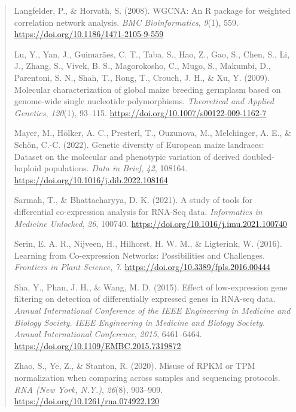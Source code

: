 \documentclass[
]{article}
\begin{document}
\begin{quote}
Langfelder, P., \& Horvath, S. (2008). WGCNA: An R package for weighted
correlation network analysis. \emph{BMC Bioinformatics}, \emph{9}(1),
559.
\href{https://doi.org/10.1186/1471-2105-9-559}{{https://doi.org/10.1186/1471-2105-9-559}}

Lu, Y., Yan, J., Guimarães, C. T., Taba, S., Hao, Z., Gao, S., Chen, S.,
Li, J., Zhang, S., Vivek, B. S., Magorokosho, C., Mugo, S., Makumbi, D.,
Parentoni, S. N., Shah, T., Rong, T., Crouch, J. H., \& Xu, Y. (2009).
Molecular characterization of global maize breeding germplasm based on
genome-wide single nucleotide polymorphisms. \emph{Theoretical and
Applied Genetics}, \emph{120}(1), 93--115.
\href{https://doi.org/10.1007/s00122-009-1162-7}{{https://doi.org/10.1007/s00122-009-1162-7}}

Mayer, M., Hölker, A. C., Presterl, T., Ouzunova, M., Melchinger, A. E.,
\& Schön, C.-C. (2022). Genetic diversity of European maize landraces:
Dataset on the molecular and phenotypic variation of derived
doubled-haploid populations. \emph{Data in Brief}, \emph{42}, 108164.
\href{https://doi.org/10.1016/j.dib.2022.108164}{{https://doi.org/10.1016/j.dib.2022.108164}}

Sarmah, T., \& Bhattacharyya, D. K. (2021). A study of tools for
differential co-expression analysis for RNA-Seq data. \emph{Informatics
in Medicine Unlocked}, \emph{26}, 100740.
\href{https://doi.org/10.1016/j.imu.2021.100740}{{https://doi.org/10.1016/j.imu.2021.100740}}

Serin, E. A. R., Nijveen, H., Hilhorst, H. W. M., \& Ligterink, W.
(2016). Learning from Co-expression Networks: Possibilities and
Challenges. \emph{Frontiers in Plant Science}, \emph{7}.
\href{https://doi.org/10.3389/fpls.2016.00444}{{https://doi.org/10.3389/fpls.2016.00444}}

Sha, Y., Phan, J. H., \& Wang, M. D. (2015). Effect of low-expression
gene filtering on detection of differentially expressed genes in RNA-seq
data. \emph{Annual International Conference of the IEEE Engineering in
Medicine and Biology Society. IEEE Engineering in Medicine and Biology
Society. Annual International Conference}, \emph{2015}, 6461--6464.
\href{https://doi.org/10.1109/EMBC.2015.7319872}{{https://doi.org/10.1109/EMBC.2015.7319872}}

Zhao, S., Ye, Z., \& Stanton, R. (2020). Misuse of RPKM or TPM
normalization when comparing across samples and sequencing protocols.
\emph{RNA (New York, N.Y.)}, \emph{26}(8), 903--909.
\href{https://doi.org/10.1261/rna.074922.120}{{https://doi.org/10.1261/rna.074922.120}}
\end{quote}
\end{document}
